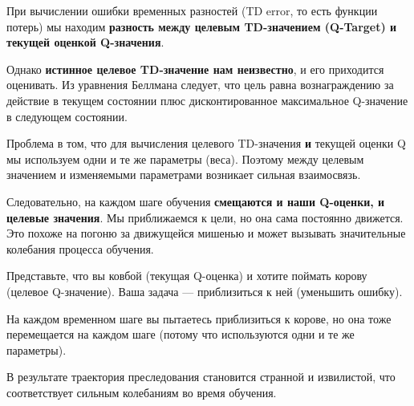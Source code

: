 \documentclass[11pt,a4paper]{article}
\begin{document}
При вычислении ошибки временных разностей (TD error, то есть функции потерь) мы находим \textbf{разность между целевым TD-значением (Q-Target) и текущей оценкой Q-значения}.

Однако \textbf{истинное целевое TD-значение нам неизвестно}, и его приходится оценивать. Из уравнения Беллмана следует, что цель равна вознаграждению за действие в текущем состоянии плюс дисконтированное максимальное Q-значение в следующем состоянии.


Проблема в том, что для вычисления целевого TD-значения \textbf{и} текущей оценки Q мы используем одни и те же параметры (веса). Поэтому между целевым значением и изменяемыми параметрами возникает сильная взаимосвязь.

Следовательно, на каждом шаге обучения \textbf{смещаются и наши Q-оценки, и целевые значения}. Мы приближаемся к цели, но она сама постоянно движется. Это похоже на погоню за движущейся мишенью и может вызывать значительные колебания процесса обучения.

Представьте, что вы ковбой (текущая Q-оценка) и хотите поймать корову (целевое Q-значение). Ваша задача --- приблизиться к ней (уменьшить ошибку).


На каждом временном шаге вы пытаетесь приблизиться к корове, но она тоже перемещается на каждом шаге (потому что используются одни и те же параметры).



В результате траектория преследования становится странной и извилистой, что соответствует сильным колебаниям во время обучения.
\end{document}
